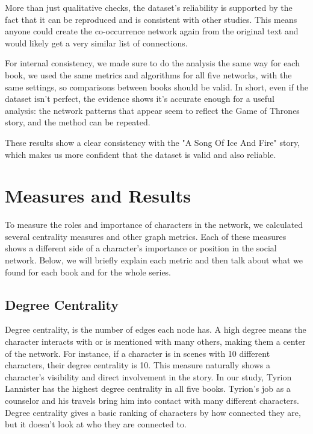 \documentclass[12pt, a4paper]{article}
\begin{document}
More than just qualitative checks, the dataset's reliability is supported by the fact that it can be reproduced and is consistent with other studies. This means anyone could create the co-occurrence network again from the original text and would 
likely get a very similar list of connections. 


For internal consistency, we made sure to do the analysis the same way for each book, we used the same metrics and algorithms 
 for all five networks, with the same settings, so comparisons between books should be valid. In short, even if the dataset isn't perfect, 
 the evidence shows it's accurate enough for a useful analysis: the network patterns that appear seem to reflect the Game of Thrones story, 
 and the method can be repeated. 
 
 These results show a clear consistency with the "A Song Of Ice And Fire" story, which makes us more confident that the dataset is valid and also reliable.
 
 

\section{Measures and Results}
\label{measures}
To measure the roles and importance of characters in the network, we calculated several centrality measures and other graph metrics. Each of these measures shows a different side of a character's importance or position in the social network. Below, we will briefly explain each metric and then talk about what we found for each book and for the whole series.

\subsection*{Degree Centrality}
Degree centrality, 
is the number of edges each node has. 
A high degree means the character interacts with or is
 mentioned with many others, making them a center of the network. 
 For instance, if a character is in scenes with 10 different characters,
  their degree centrality is 10. 
  This measure naturally shows a character's
   visibility and direct involvement in the story. 
   In our study, Tyrion Lannister has the highest 
   degree centrality in all five books. 
     Tyrion's job as a counselor and his travels bring him into 
     contact with many different characters.
      Degree centrality gives a basic ranking of characters 
      by how connected they are, but it doesn't look at who 
      they are connected to.
\end{document}
